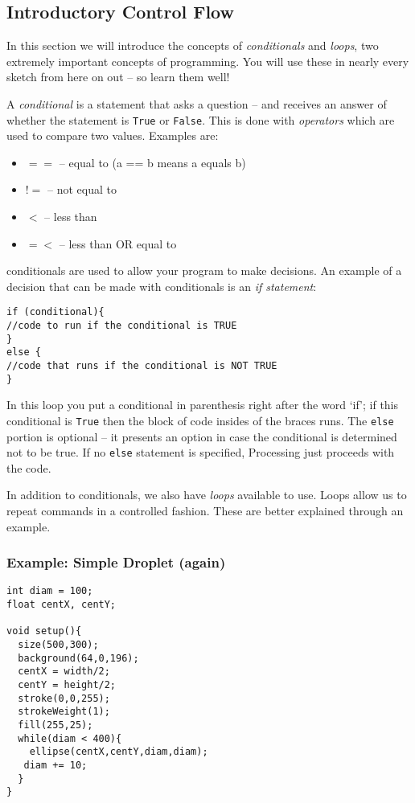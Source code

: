 \subsection{Introductory Control Flow}
In this section we will introduce the concepts of \emph{conditionals} and \emph{loops}, two extremely important concepts of programming.  You will use these in nearly every sketch from here on out -- so learn them well!

A \emph{conditional} is a statement that asks a question -- and receives an answer of whether the statement is \texttt{True} or \texttt{False}.  This is done with \emph{operators} which are used to compare two values.  Examples are:

\begin{itemize}
\item $==$ -- equal to (a == b means a equals b)
\item $!=$ -- not equal to
\item $<$ -- less than
\item $=<$ -- less than OR equal to
\end{itemize}

conditionals are used to allow your program to make decisions.  An example of a decision that can be made with conditionals is an \emph{if statement}:

\begin{verbatim}
if (conditional){
//code to run if the conditional is TRUE
}
else {
//code that runs if the conditional is NOT TRUE
}
\end{verbatim}

In this loop you put a conditional in parenthesis right after the word `if'; if this conditional is \texttt{True} then the block of code insides of the braces runs.  The \texttt{else} portion is optional -- it presents an option in case the conditional is determined not to be true.  If no \texttt{else} statement is specified, Processing just proceeds with the code.

In addition to conditionals, we also have \emph{loops} available to use.  Loops allow us to repeat commands in a controlled fashion.  These are better explained through an example.

\subsubsection{Example: Simple Droplet (again)}
\begin{verbatim}
int diam = 100;
float centX, centY;

void setup(){
  size(500,300);
  background(64,0,196);
  centX = width/2;
  centY = height/2;
  stroke(0,0,255);
  strokeWeight(1);
  fill(255,25);
  while(diam < 400){
    ellipse(centX,centY,diam,diam);
   diam += 10; 
  }
}
\end{verbatim}

